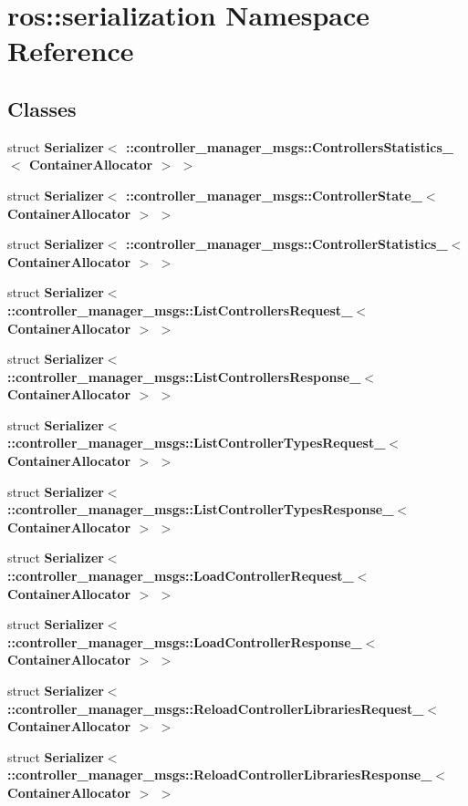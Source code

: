\section{ros\-:\-:serialization \-Namespace \-Reference}
\label{namespaceros_1_1serialization}
\subsection*{\-Classes}
\begin{DoxyCompactItemize}
\item 
struct {\bf \-Serializer$<$ \-::controller\-\_\-manager\-\_\-msgs\-::\-Controllers\-Statistics\-\_\-$<$ Container\-Allocator $>$ $>$}
\item 
struct {\bf \-Serializer$<$ \-::controller\-\_\-manager\-\_\-msgs\-::\-Controller\-State\-\_\-$<$ Container\-Allocator $>$ $>$}
\item 
struct {\bf \-Serializer$<$ \-::controller\-\_\-manager\-\_\-msgs\-::\-Controller\-Statistics\-\_\-$<$ Container\-Allocator $>$ $>$}
\item 
struct {\bf \-Serializer$<$ \-::controller\-\_\-manager\-\_\-msgs\-::\-List\-Controllers\-Request\-\_\-$<$ Container\-Allocator $>$ $>$}
\item 
struct {\bf \-Serializer$<$ \-::controller\-\_\-manager\-\_\-msgs\-::\-List\-Controllers\-Response\-\_\-$<$ Container\-Allocator $>$ $>$}
\item 
struct {\bf \-Serializer$<$ \-::controller\-\_\-manager\-\_\-msgs\-::\-List\-Controller\-Types\-Request\-\_\-$<$ Container\-Allocator $>$ $>$}
\item 
struct {\bf \-Serializer$<$ \-::controller\-\_\-manager\-\_\-msgs\-::\-List\-Controller\-Types\-Response\-\_\-$<$ Container\-Allocator $>$ $>$}
\item 
struct {\bf \-Serializer$<$ \-::controller\-\_\-manager\-\_\-msgs\-::\-Load\-Controller\-Request\-\_\-$<$ Container\-Allocator $>$ $>$}
\item 
struct {\bf \-Serializer$<$ \-::controller\-\_\-manager\-\_\-msgs\-::\-Load\-Controller\-Response\-\_\-$<$ Container\-Allocator $>$ $>$}
\item 
struct {\bf \-Serializer$<$ \-::controller\-\_\-manager\-\_\-msgs\-::\-Reload\-Controller\-Libraries\-Request\-\_\-$<$ Container\-Allocator $>$ $>$}
\item 
struct {\bf \-Serializer$<$ \-::controller\-\_\-manager\-\_\-msgs\-::\-Reload\-Controller\-Libraries\-Response\-\_\-$<$ Container\-Allocator $>$ $>$}

\end{DoxyCompactItemize}
